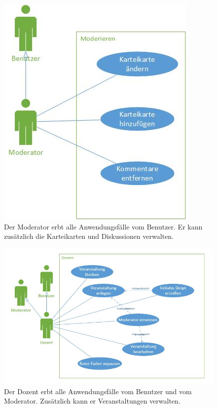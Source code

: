 \documentclass[12pt,a4paper]{article}
\begin{document}
\begin{figure}[H]
	\centering
	\includegraphics[width=\textwidth]{Bilder/Anwendungsfalldiagramme/Moderator.jpg}
	\caption{Der Moderator erbt alle Anwendungsfälle vom Benutzer. Er kann zusätzlich die Karteikarten und Diskussionen verwalten.}
	\label{AwfModerator}
\end{figure}

\begin{figure}[H]
	\centering
	\includegraphics[width=\textwidth]{Bilder/Anwendungsfalldiagramme/abbildung3.jpg}
	\caption{Der Dozent erbt alle Anwendungsfälle vom Benutzer und vom Moderator. Zusätzlich kann er Veranstaltungen verwalten.}
	\label{AwfDozent}
\end{figure}
\end{document}
